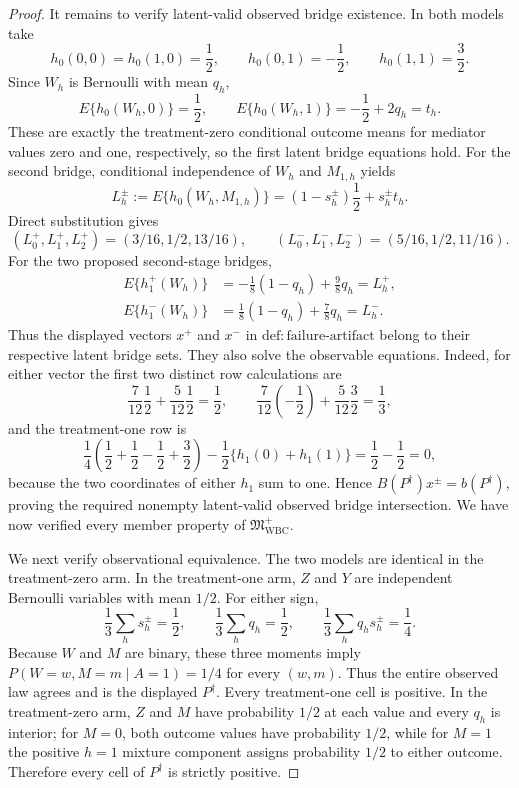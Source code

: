 \documentclass{article}
\begin{document}
\begin{proof}
It remains to verify latent-valid observed bridge existence.  In both models
take
\[
 h_0(0,0)=h_0(1,0)=\frac12,\qquad
 h_0(0,1)=-\frac12,\qquad h_0(1,1)=\frac32.
\]
Since \(W_h\) is Bernoulli with mean \(q_h\),
\[
 E\{h_0(W_h,0)\}=\frac12,\qquad
 E\{h_0(W_h,1)\}=-\frac12+2q_h=t_h.
\]
These are exactly the treatment-zero conditional outcome means for mediator
values zero and one, respectively, so the first latent bridge equations hold.
For the second bridge, conditional independence of \(W_h\) and
\(M_{1,h}\) yields
\[
 L_h^{\pm}:=E\{h_0(W_h,M_{1,h})\}
   =(1-s_h^{\pm})\frac12+s_h^{\pm}t_h.
\]
Direct substitution gives
\[
 (L_0^+,L_1^+,L_2^+)=(3/16,1/2,13/16),\qquad
 (L_0^-,L_1^-,L_2^-)=(5/16,1/2,11/16).
\]
For the two proposed second-stage bridges,
\[
\begin{aligned}
 E\{h_1^+(W_h)\}
   &=-\frac18(1-q_h)+\frac98q_h=L_h^+,\\
 E\{h_1^-(W_h)\}
   &= \frac18(1-q_h)+\frac78q_h=L_h^-.
\end{aligned}
\]
Thus the displayed vectors \(x^+\) and \(x^-\) in
\(\mathrm{def{:}failure\text{-}artifact}\) belong to their respective
latent bridge sets.  They also solve the observable equations.  Indeed, for
either vector the first two distinct row calculations are
\[
 \frac7{12}\frac12+\frac5{12}\frac12=\frac12,
 \qquad
 \frac7{12}\left(-\frac12\right)
   +\frac5{12}\frac32=\frac13,
\]
and the treatment-one row is
\[
 \frac14\left(\frac12+\frac12-\frac12+\frac32\right)
 -\frac12\{h_1(0)+h_1(1)\}=\frac12-\frac12=0,
\]
because the two coordinates of either \(h_1\) sum to one.  Hence
\(B(P^{\dagger})x^{\pm}=b(P^{\dagger})\), proving the required nonempty
latent-valid observed bridge intersection.  We have now verified every member
property of \(\mathfrak M_{\mathrm{WBC}}^{+}\).

We next verify observational equivalence.  The two models are identical in
the treatment-zero arm.  In the treatment-one arm, \(Z\) and \(Y\) are
independent Bernoulli variables with mean \(1/2\).  For either sign,
\[
 \frac13\sum_h s_h^{\pm}=\frac12,\qquad
 \frac13\sum_h q_h=\frac12,\qquad
 \frac13\sum_h q_hs_h^{\pm}=\frac14.
\]
Because \(W\) and \(M\) are binary, these three moments imply
\(P(W=w,M=m\mid A=1)=1/4\) for every \((w,m)\).  Thus the entire observed
law agrees and is the displayed \(P^{\dagger}\).  Every treatment-one cell
is positive.  In the treatment-zero arm, \(Z\) and \(M\) have probability
\(1/2\) at each value and every \(q_h\) is interior; for \(M=0\), both
outcome values have probability \(1/2\), while for \(M=1\) the positive
\(h=1\) mixture component assigns probability \(1/2\) to either outcome.
Therefore every cell of \(P^{\dagger}\) is strictly positive.


\end{proof}
\end{document}

